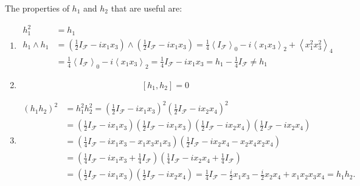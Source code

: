\documentclass[aps,preprint]{revtex4}%
\begin{document}
The properties of $h_{1}$ and $h_{2}$ that are useful are:

\begin{enumerate}
\item
\begin{align}
h_{1}^{2} &  =h_{1}\\
h_{1}\wedge h_{1} &  =\left(  \frac{1}{2}I_{\mathcal{F}}-ix_{1}x_{3}\right)
\wedge\left(  \frac{1}{2}I_{\mathcal{F}}-ix_{1}x_{3}\right)  =\frac{1}%
{4}\left\langle I_{\mathcal{F}}\right\rangle _{0}-i\left\langle x_{1}%
x_{3}\right\rangle _{2}+\left\langle x_{1}^{2}x_{3}^{2}\right\rangle _{4}\\
&  =\frac{1}{4}\left\langle I_{\mathcal{F}}\right\rangle _{0}-i\left\langle
x_{1}x_{3}\right\rangle _{2}=\frac{1}{4}I_{\mathcal{F}}-ix_{1}x_{3}%
=h_{1}-\frac{1}{4}I_{\mathcal{F}}\neq h_{1}%
\end{align}


\item
\begin{equation}
\left[  h_{1},h_{2}\right]  =0
\end{equation}


\item
\begin{align}
\left(  h_{1}h_{2}\right)  ^{2}  &  =h_{1}^{2}h_{2}^{2}=\left(  \frac{1}%
{2}I_{\mathcal{F}}-ix_{1}x_{3}\right)  ^{2}\left(  \frac{1}{2}I_{\mathcal{F}%
}-ix_{2}x_{4}\right)  ^{2}\\
&  =\left(  \frac{1}{2}I_{\mathcal{F}}-ix_{1}x_{3}\right)  \left(  \frac{1}%
{2}I_{\mathcal{F}}-ix_{1}x_{3}\right)  \left(  \frac{1}{2}I_{\mathcal{F}%
}-ix_{2}x_{4}\right)  \left(  \frac{1}{2}I_{\mathcal{F}}-ix_{2}x_{4}\right) \\
&  =\left(  \frac{1}{4}I_{\mathcal{F}}-ix_{1}x_{3}-x_{1}x_{3}x_{1}%
x_{3}\right)  \left(  \frac{1}{2}I_{\mathcal{F}}-ix_{2}x_{4}-x_{2}x_{4}%
x_{2}x_{4}\right) \\
&  =\left(  \frac{1}{4}I_{\mathcal{F}}-ix_{1}x_{3}+\frac{1}{4}I_{\mathcal{F}%
}\right)  \left(  \frac{1}{4}I_{\mathcal{F}}-ix_{2}x_{4}+\frac{1}%
{4}I_{\mathcal{F}}\right) \\
&  =\left(  \frac{1}{2}I_{\mathcal{F}}-ix_{1}x_{3}\right)  \left(  \frac{1}%
{2}I_{\mathcal{F}}-ix_{2}x_{4}\right)  =\frac{1}{4}I_{\mathcal{F}}-\frac{i}%
{2}x_{1}x_{3}-\frac{i}{2}x_{2}x_{4}+x_{1}x_{2}x_{3}x_{4}=h_{1}h_{2}.
\end{align}



\end{enumerate}
\end{document}
